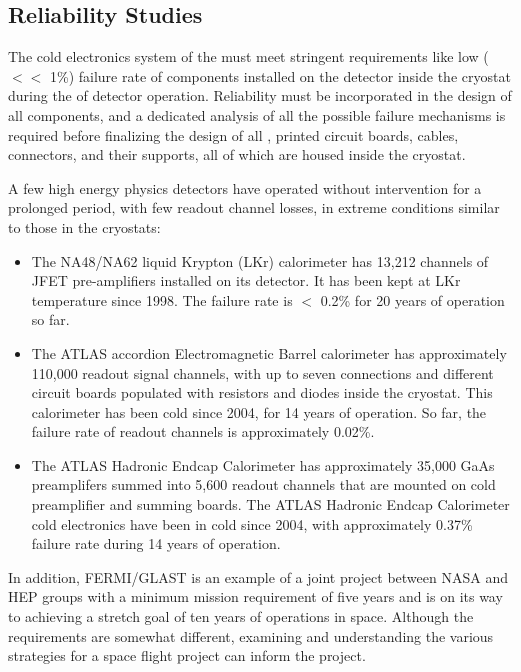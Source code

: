 \subsection{Reliability Studies}
\label{sec:fdsp-tpcelec-qa-reliability}

The  cold electronics system of the    must meet 
stringent requirements like low ($<<$ 1\%) failure rate of components installed 
on the detector inside the cryostat during the \dunelifetime of 
detector operation. Reliability must be incorporated in the 
design of all components, and a dedicated analysis of all the possible failure mechanisms is required 
before finalizing the design of all , printed circuit boards, cables, 
connectors, and their supports, all of which are housed inside the   
cryostat. 

A few high energy physics detectors have operated without intervention for a 
prolonged period, with few readout channel losses, in extreme 
conditions similar to those in the  cryostats:
\begin{itemize}
	\item The NA48/NA62 liquid Krypton (LKr) calorimeter has 13,212 channels 
	of JFET pre-amplifiers installed on its detector. It has been kept at LKr temperature 
	since 1998. The failure rate is $<$ 0.2\% for 20 years of operation so far.
	\item The ATLAS  accordion Electromagnetic Barrel calorimeter has 
	approximately 110,000 readout signal channels, with up to seven connections and different 
	circuit boards populated with resistors and diodes inside the cryostat. This
        calorimeter has been cold since 2004, for 14 years of operation. So far, the
        failure rate of readout channels is approximately 0.02\%.
        \item The ATLAS  Hadronic Endcap Calorimeter has approximately 35,000 GaAs
        preamplifers summed into 5,600 readout channels that are mounted on cold preamplifier
        and summing boards. The ATLAS  Hadronic Endcap 
        Calorimeter cold electronics have been in cold since 2004, with approximately 
        0.37\% failure rate during 14 years of operation. 
\end{itemize}
In addition, FERMI/GLAST is an example of a joint project between NASA and HEP groups 
with a minimum mission requirement of five years and is on its way to achieving a 
stretch goal of ten years of operations in space. Although the requirements are somewhat 
different, examining and understanding the various strategies for a space 
flight project can inform the  project. 

